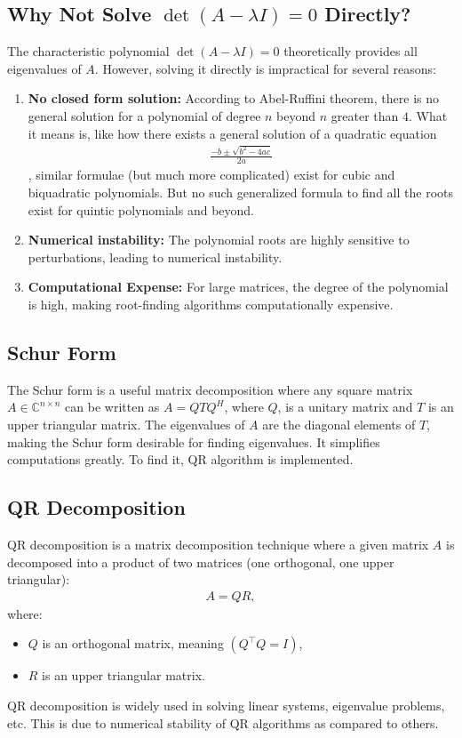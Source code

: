 \documentclass[12pt]{article}
\begin{document}
\subsection{Why Not Solve $\det(A - \lambda I) = 0 $ Directly?}
The characteristic polynomial $\det(A - \lambda I) = 0$ theoretically provides all eigenvalues of $A$. However, solving it directly is impractical for several reasons:
\begin{enumerate}
    \item \textbf{No closed form solution: } According to Abel-Ruffini theorem, there is no general solution for a polynomial of degree $n$ beyond $n$ greater than $4$. What it means is, like how there exists a general solution of a quadratic equation 
    \begin{align*}
    \frac{-b \pm \sqrt{b^2-4ac}}{2a}
    \end{align*}
    , similar formulae (but much more complicated) exist for cubic and biquadratic polynomials. But no such generalized formula to find all the roots exist for quintic polynomials and beyond.
    \item \textbf{Numerical instability:} The polynomial roots are highly sensitive to perturbations, leading to numerical instability.
    \item \textbf{Computational Expense:} For large matrices, the degree of the polynomial is high, making root-finding algorithms computationally expensive.
\end{enumerate}
\subsection{Schur Form}

The Schur form is a useful matrix decomposition where any square matrix $A \in \mathbb{C}^{n \times n}$ can be written as $ A = Q T Q^H $, where $Q$, is a unitary matrix and $T$ is an upper triangular matrix. The eigenvalues of $A$ are the diagonal elements of $T$, making the Schur form desirable for finding eigenvalues. It simplifies computations greatly. To find it, QR algorithm is implemented.

\subsection{QR Decomposition}

QR decomposition is a matrix decomposition technique where a given matrix $A$ is decomposed into a product of two matrices (one orthogonal, one upper triangular):
\begin{align*}
A = QR,
\end{align*}
where:
\begin{itemize}
    \item $Q$ is an orthogonal matrix, meaning $(Q^{\top} Q = I)$,
    \item $R$ is an upper triangular matrix.
\end{itemize}
QR decomposition is widely used in solving linear systems, eigenvalue problems, etc. This is due to numerical stability of QR algorithms as compared to others.
\end{document}
